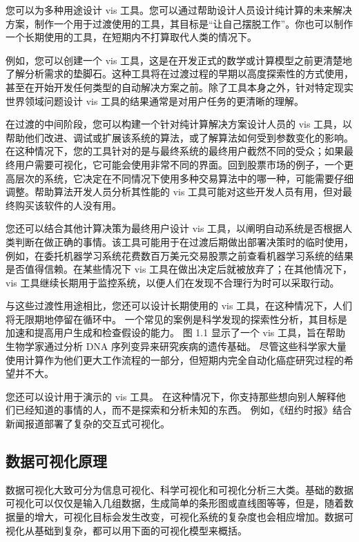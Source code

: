 \documentclass[lang=cn,color=black,10pt,founder,newtx]{elegantbook}
\begin{document}
您可以为多种用途设计 vis 工具。您可以通过帮助设计人员设计纯计算的未来解决方案，制作一个用于过渡使用的工具，其目标是“让自己摆脱工作”。你也可以制作一个长期使用的工具，在短期内不打算取代人类的情况下。

例如，您可以创建一个 vis 工具，这是在开发正式的数学或计算模型之前更清楚地了解分析需求的垫脚石。这种工具将在过渡过程的早期以高度探索性的方式使用，甚至在开始开发任何类型的自动解决方案之前。除了工具本身之外，针对特定现实世界领域问题设计 vis 工具的结果通常是对用户任务的更清晰的理解。

在过渡的中间阶段，您可以构建一个针对纯计算解决方案设计人员的 vis 工具，以帮助他们改进、调试或扩展该系统的算法，或了解算法如何受到参数变化的影响。在这种情况下，您的工具针对的是与最终系统的最终用户截然不同的受众；如果最终用户需要可视化，它可能会使用非常不同的界面。回到股票市场的例子，一个更高层次的系统，它决定在不同情况下使用多种交易算法中的哪一种，可能需要仔细调整。帮助算法开发人员分析其性能的 vis 工具可能对这些开发人员有用，但对最终购买该软件的人没有用。

您还可以结合其他计算决策为最终用户设计 vis 工具，以阐明自动系统是否根据人类判断在做正确的事情。该工具可能用于在过渡后期做出部署决策时的临时使用，例如，在委托机器学习系统花费数百万美元交易股票之前查看机器学习系统的结果是否值得信赖。在某些情况下 vis 工具在做出决定后就被放弃了；在其他情况下，vis 工具继续长期用于监控系统，以便人们在发现不合理行为时可以采取行动。

与这些过渡性用途相比，您还可以设计长期使用的 vis 工具，在这种情况下，人们将无限期地停留在循环中。 一个常见的案例是科学发现的探索性分析，其目标是加速和提高用户生成和检查假设的能力。 图 1.1 显示了一个 vis 工具，旨在帮助生物学家通过分析 DNA 序列变异来研究疾病的遗传基础。 尽管这些科学家大量使用计算作为他们更大工作流程的一部分，但短期内完全自动化癌症研究过程的希望并不大。

您还可以设计用于演示的 vis 工具。 在这种情况下，你支持那些想向别人解释他们已经知道的事情的人，而不是探索和分析未知的东西。 例如，《纽约时报》结合新闻报道部署了复杂的交互式可视化。

\subsection{数据可视化原理}

数据可视化大致可分为信息可视化、科学可视化和可视化分析三大类。基础的数据可视化可以仅仅是输入几组数据，生成简单的条形图或直线图等等，但是，随着数据量的增大，可视化目标会发生改变，可视化系统的复杂度也会相应增加。数据可视化从基础到复杂，都可以用下面的可视化模型来概括。
 
\end{document}
